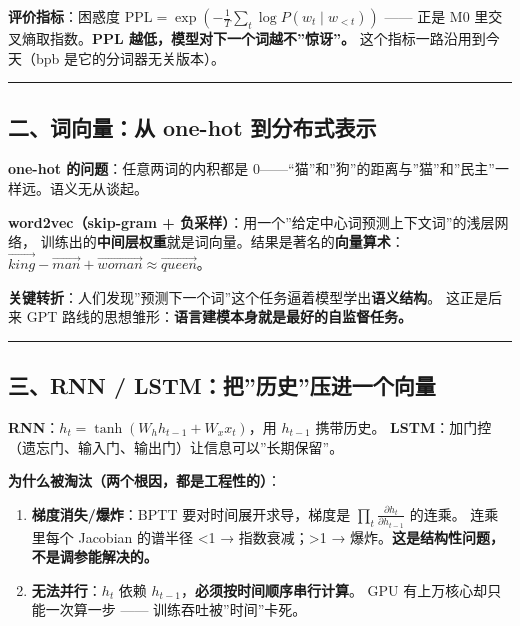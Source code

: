 \documentclass[
  chinese,
  11pt,
]{ctexart}
\providecommand{\tightlist}{%
  \setlength{\itemsep}{0pt}\setlength{\parskip}{0pt}}
\begin{document}
\textbf{评价指标}：困惑度 \(\mathrm{PPL}=\exp(-\frac{1}{T}\sum_t \log P(w_t\mid w_{<t}))\) ------ 正是 M0 里交叉熵取指数。\textbf{PPL 越低，模型对下一个词越不''惊讶''。} 这个指标一路沿用到今天（bpb 是它的分词器无关版本）。

\begin{center}\rule{0.5\linewidth}{0.5pt}\end{center}

\subsection{二、词向量：从 one-hot 到分布式表示}\label{ux4e8cux8bcdux5411ux91cfux4ece-one-hot-ux5230ux5206ux5e03ux5f0fux8868ux793a}

\textbf{one-hot 的问题}：任意两词的内积都是 0------``猫''和''狗''的距离与''猫''和''民主''一样远。语义无从谈起。

\textbf{word2vec（skip-gram + 负采样）}：用一个''给定中心词预测上下文词''的浅层网络， 训练出的\textbf{中间层权重}就是词向量。结果是著名的\textbf{向量算术}：\(\vec{king}-\vec{man}+\vec{woman}\approx\vec{queen}\)。

\textbf{关键转折}：人们发现''预测下一个词''这个任务逼着模型学出\textbf{语义结构}。 这正是后来 GPT 路线的思想雏形：\textbf{语言建模本身就是最好的自监督任务。}

\begin{center}\rule{0.5\linewidth}{0.5pt}\end{center}

\subsection{三、RNN / LSTM：把''历史''压进一个向量}\label{ux4e09rnn-lstmux628aux5386ux53f2ux538bux8fdbux4e00ux4e2aux5411ux91cf}

\textbf{RNN}：\(h_t = \tanh(W_h h_{t-1} + W_x x_t)\)，用 \(h_{t-1}\) 携带历史。 \textbf{LSTM}：加门控（遗忘门、输入门、输出门）让信息可以''长期保留''。

\textbf{为什么被淘汰（两个根因，都是工程性的）}：

\begin{enumerate}
\def\labelenumi{\arabic{enumi}.}
\tightlist
\item
  \textbf{梯度消失/爆炸}：BPTT 要对时间展开求导，梯度是 \(\prod_t \frac{\partial h_t}{\partial h_{t-1}}\) 的连乘。 连乘里每个 Jacobian 的谱半径 \textless1 → 指数衰减；\textgreater1 → 爆炸。\textbf{这是结构性问题，不是调参能解决的。}
\item
  \textbf{无法并行}：\(h_t\) 依赖 \(h_{t-1}\)，\textbf{必须按时间顺序串行计算}。 GPU 有上万核心却只能一次算一步 ------ 训练吞吐被''时间''卡死。
\end{enumerate}
\end{document}
